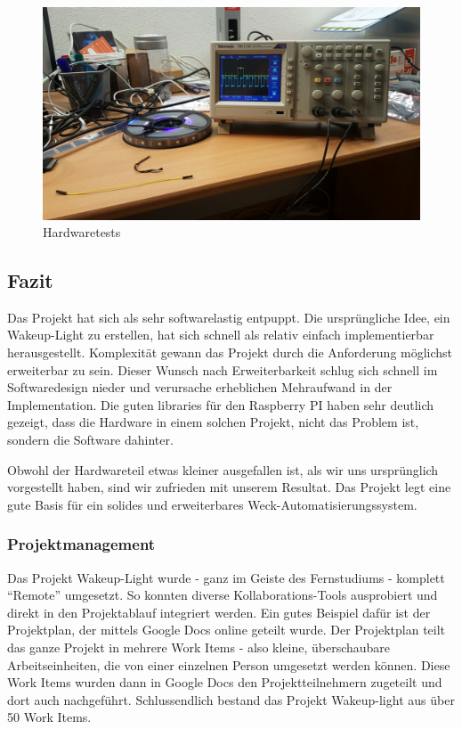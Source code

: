\documentclass[]{article}
\begin{document}
\begin{figure}[H]
\centering
\includegraphics{../pictures/oszi.jpeg}
\caption{Hardwaretests}
\end{figure}

\subsection{Fazit}\label{fazit}

Das Projekt hat sich als sehr softwarelastig entpuppt. Die ursprüngliche
Idee, ein Wakeup-Light zu erstellen, hat sich schnell als relativ
einfach implementierbar herausgestellt. Komplexität gewann das Projekt
durch die Anforderung möglichst erweiterbar zu sein. Dieser Wunsch nach
Erweiterbarkeit schlug sich schnell im Softwaredesign nieder und
verursache erheblichen Mehraufwand in der Implementation. Die guten
libraries für den Raspberry PI haben sehr deutlich gezeigt, dass die
Hardware in einem solchen Projekt, nicht das Problem ist, sondern die
Software dahinter.

Obwohl der Hardwareteil etwas kleiner ausgefallen ist, als wir uns
ursprünglich vorgestellt haben, sind wir zufrieden mit unserem Resultat.
Das Projekt legt eine gute Basis für ein solides und erweiterbares
Weck-Automatisierungssystem.

\subsubsection{Projektmanagement}\label{projektmanagement-1}

Das Projekt Wakeup-Light wurde - ganz im Geiste des Fernstudiums -
komplett ``Remote'' umgesetzt. So konnten diverse Kollaborations-Tools
ausprobiert und direkt in den Projektablauf integriert werden. Ein gutes
Beispiel dafür ist der Projektplan, der mittels Google Docs online
geteilt wurde. Der Projektplan teilt das ganze Projekt in mehrere Work
Items - also kleine, überschaubare Arbeitseinheiten, die von einer
einzelnen Person umgesetzt werden können. Diese Work Items wurden dann
in Google Docs den Projektteilnehmern zugeteilt und dort auch
nachgeführt. Schlussendlich bestand das Projekt Wakeup-light aus über 50
Work Items.
\end{document}
